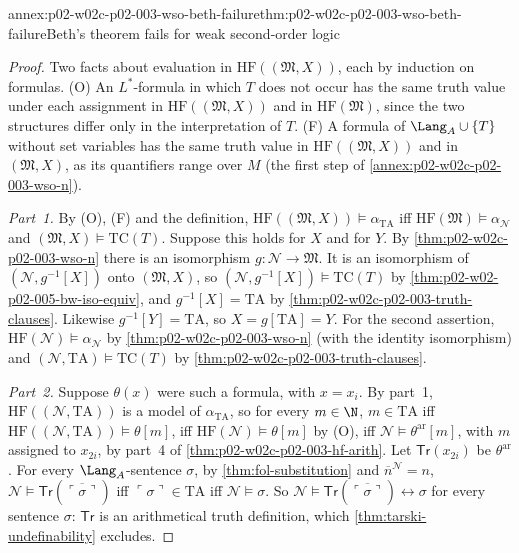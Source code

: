 \begin{annexitem}{annex:p02-w02c-p02-003-wso-beth-failure}{thm:p02-w02c-p02-003-wso-beth-failure}{Beth's theorem fails for weak second-order logic}
\begin{proof}
Two facts about evaluation in \(\mathrm{HF}((\mathfrak M,X))\), each by
induction on formulas.  (O) An \(L^{*}\)-formula in which \(T\) does not
occur has the same truth value under each assignment in
\(\mathrm{HF}((\mathfrak M,X))\) and in \(\mathrm{HF}(\mathfrak M)\), since
the two structures differ only in the interpretation of \(T\).  (F) A
formula of \(\Lang_A\cup\{T\}\) without set variables has the same truth
value in \(\mathrm{HF}((\mathfrak M,X))\) and in \((\mathfrak M,X)\), as
its quantifiers range over \(M\) (the first step of
\cref{annex:p02-w02c-p02-003-wso-n}).

\emph{Part~1.}  By (O), (F) and the definition,
\(\mathrm{HF}((\mathfrak M,X))\models\alpha_{\mathrm{TA}}\) iff
\(\mathrm{HF}(\mathfrak M)\models\alpha_{\mathcal N}\) and
\((\mathfrak M,X)\models\mathrm{TC}(T)\).  Suppose this holds for \(X\) and
for \(Y\).  By \cref{thm:p02-w02c-p02-003-wso-n} there is an isomorphism
\(g\colon\mathcal N\to\mathfrak M\).  It is an isomorphism of
\((\mathcal N,g^{-1}[X])\) onto \((\mathfrak M,X)\), so
\((\mathcal N,g^{-1}[X])\models\mathrm{TC}(T)\) by
\cref{thm:p02-w02-p02-005-bw-iso-equiv}, and \(g^{-1}[X]=\mathrm{TA}\) by
\cref{thm:p02-w02c-p02-003-truth-clauses}.  Likewise
\(g^{-1}[Y]=\mathrm{TA}\), so \(X=g[\mathrm{TA}]=Y\).  For the second
assertion, \(\mathrm{HF}(\mathcal N)\models\alpha_{\mathcal N}\) by
\cref{thm:p02-w02c-p02-003-wso-n} (with the identity isomorphism) and
\((\mathcal N,\mathrm{TA})\models\mathrm{TC}(T)\) by
\cref{thm:p02-w02c-p02-003-truth-clauses}.

\emph{Part~2.}  Suppose \(\theta(x)\) were such a formula, with
\(x=x_i\).  By part~1, \(\mathrm{HF}((\mathcal N,\mathrm{TA}))\) is a model
of \(\alpha_{\mathrm{TA}}\), so for every \(m\in\N\), \(m\in\mathrm{TA}\)
iff \(\mathrm{HF}((\mathcal N,\mathrm{TA}))\models\theta[m]\), iff
\(\mathrm{HF}(\mathcal N)\models\theta[m]\) by (O), iff
\(\mathcal N\models\theta^{\mathrm{ar}}[m]\), with \(m\) assigned to
\(x_{2i}\), by part~4 of \cref{thm:p02-w02c-p02-003-hf-arith}.  Let
\(\mathsf{Tr}(x_{2i})\) be \(\theta^{\mathrm{ar}}\).  For every
\(\Lang_A\)-sentence \(\sigma\), by \cref{thm:fol-substitution} and
\(\overline n^{\mathcal N}=n\),
\(\mathcal N\models\mathsf{Tr}(\overline{\ulcorner\sigma\urcorner})\) iff
\(\ulcorner\sigma\urcorner\in\mathrm{TA}\) iff \(\mathcal N\models\sigma\).
So \(\mathcal N\models\mathsf{Tr}(\overline{\ulcorner\sigma\urcorner})
\leftrightarrow\sigma\) for every sentence \(\sigma\): \(\mathsf{Tr}\) is an
arithmetical truth definition, which \cref{thm:tarski-undefinability}
excludes.
\end{proof}
\end{annexitem}

